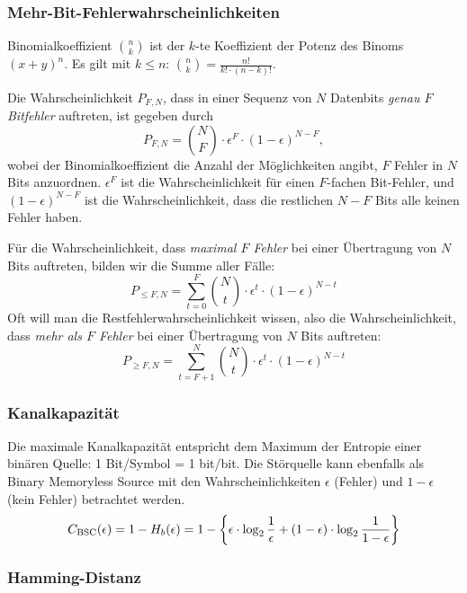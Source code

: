 \subsubsection{Mehr-Bit-Fehlerwahrscheinlichkeiten}

\begin{definition}{Binomialkoeffizient}
    $\binom{n}{k}$ ist der $k$-te Koeffizient der Potenz des Binoms $(x + y)^n$.
    Es gilt mit $k \leq n$: $\binom{n}{k} = \frac{n!}{k! \cdot (n-k)!}.$
\end{definition}

\begin{definition}{}
    Die Wahrscheinlichkeit $P_{F,N}$, dass in einer Sequenz von $N$ Datenbits \emph{genau $F$ Bitfehler} auftreten, ist gegeben durch \[P_{F,N} = \binom{N}{F} \cdot \epsilon^F \cdot (1 - \epsilon)^{N-F},\] wobei der Binomialkoeffizient die Anzahl der Möglichkeiten angibt, $F$ Fehler in $N$ Bits anzuordnen. $\epsilon^F$ ist die Wahrscheinlichkeit für einen $F$-fachen Bit-Fehler, und $(1 - \epsilon)^{N-F}$ ist die Wahrscheinlichkeit, dass die restlichen $N-F$ Bits alle keinen Fehler haben.
\end{definition}

Für die Wahrscheinlichkeit, dass \emph{maximal $F$ Fehler} bei einer Übertragung von $N$ Bits auftreten, bilden wir die Summe aller Fälle: \[P_{\leq F,N} = \sum_{t=0}^{F} \binom{N}{t} \cdot \epsilon^t \cdot (1 - \epsilon)^{N-t}\]
Oft will man die Restfehlerwahrscheinlichkeit wissen, also die Wahrscheinlichkeit, dass \emph{mehr als $F$ Fehler} bei einer Übertragung von $N$ Bits auftreten: \[P_{\geq F,N} = \sum_{t=F+1}^{N} \binom{N}{t} \cdot \epsilon^t \cdot (1-\epsilon)^{N-t}\]

\subsubsection{Kanalkapazität}

Die maximale Kanalkapazität entspricht dem Maximum der Entropie einer binären Quelle: 1 Bit/Symbol = 1 bit/bit.
Die Störquelle kann ebenfalls als Binary Memoryless Source mit den Wahrscheinlichkeiten $\epsilon$ (Fehler) und $1-\epsilon$ (kein Fehler) betrachtet werden. \[C_{\text{BSC}}(\epsilon) = 1 - H_b(\epsilon) \\
= 1 - \left\{ \epsilon \cdot \log_2 \frac{1}{\epsilon} + (1-\epsilon) \cdot \log_2 \frac{1}{1-\epsilon}\right\}\]

\subsubsection{Hamming-Distanz}

